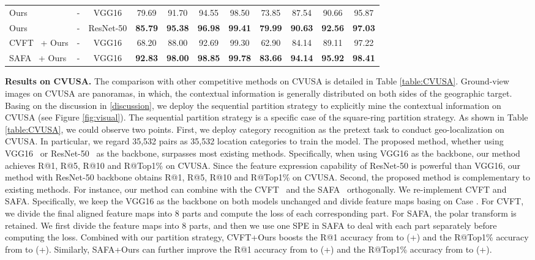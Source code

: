 \documentclass[journal]{IEEEtran}
\begin{document}
\begin{table*}[htp]
\begin{tabular}{l|c|c|cccc|cccc}
Ours & - & VGG16 & 79.69 & 91.70 & 94.55 & 98.50 & 73.85 & 87.54 & 90.66 & 95.87\\
Ours & - & ResNet-50 & \textbf{85.79} & \textbf{95.38} & \textbf{96.98} & \textbf{99.41} & \textbf{79.99} & \textbf{90.63} & \textbf{92.56} & \textbf{97.03}\\
CVFT~\cite{shi_optimal_nodate} + Ours & - & VGG16 & 68.20 & 88.00 & 92.69 & 99.30 & 62.90 & 84.14 & 89.11 & 97.22\\
SAFA~\cite{shi_spatial-aware_nodate} + Ours & - & VGG16 & \textbf{92.83} & \textbf{98.00} & \textbf{98.85} & \textbf{99.78} & \textbf{83.66} & \textbf{94.14} & \textbf{95.92} & \textbf{98.41}\\
\hline
\end{tabular}
\label{table:CVUSA}
\end{table*}
\textbf{Results on CVUSA.}
The comparison with other competitive methods on CVUSA is detailed in Table \ref{table:CVUSA}. 
Ground-view images on CVUSA are panoramas, in which, the contextual information is generally distributed on both sides of the geographic target. Basing on the discussion in \ref{discussion}, we deploy the sequential partition strategy to explicitly mine the contextual information on CVUSA (see Figure \ref{fig:visual}). The sequential partition strategy is a specific case of the square-ring partition strategy.
As shown in Table \ref{table:CVUSA}, we could observe two points. 
First, we deploy category recognition as the pretext task to conduct geo-localization on CVUSA. In particular, we regard 35,532 pairs as 35,532 location categories to train the model. The proposed method, whether using VGG16~\cite{vgg} or ResNet-50~\cite{he2016deep} as the backbone, surpasses most existing methods. Specifically, when using VGG16 as the backbone, our method achieves  R@1,  R@5,  R@10 and  R@Top1\% on CVUSA. Since the feature expression capability of ResNet-50 is powerful than VGG16, our method with ResNet-50 backbone obtains  R@1,  R@5,  R@10 and  R@Top1\% on CVUSA.
Second, the proposed method is complementary to existing methods. 
For instance, our method can combine with the CVFT~\cite{shi_optimal_nodate} and the SAFA~\cite{shi_spatial-aware_nodate} orthogonally. We re-implement CVFT and SAFA. Specifically, we keep the VGG16 as the backbone on both models unchanged and divide feature maps basing on Case \uppercase\expandafter{}. For CVFT, we divide the final aligned feature maps into 8 parts and compute the loss of each corresponding part. For SAFA, the polar transform is retained. We first divide the feature maps into 8 parts, and then we use one SPE in SAFA to deal with each part separately before computing the loss. 
Combined with our partition strategy, CVFT+Ours boosts the R@1 accuracy from  to  (+) and the R@Top1\% accuracy from  to  (+). Similarly, SAFA+Ours can further improve the R@1 accuracy from  to  (+) and the R@Top1\% accuracy from  to  (+).
\end{document}
